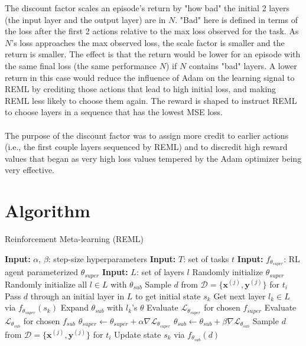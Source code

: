 The discount factor scales an episode's return by "how bad" the 
initial 2 layers (the input layer and the output layer) are in $N$. "Bad" here is 
defined in terms of the loss after the first 2 actions relative to the max 
loss observed for the task. 
As $N$'s loss approaches the max observed loss, the scale factor is smaller and 
the return is smaller.
The effect is that the return would be lower for an episode with the same final 
loss (the same performance $N$) if $N$ contains "bad" layers. A lower return in this 
case would reduce the influence of Adam on the learning signal to REML by 
crediting those actions that lead to high initial loss, and making REML less likely 
to choose them again. The reward is shaped to instruct REML to choose layers 
in a sequence that has the lowest MSE loss.
\\\\
The purpose of the discount 
factor was to assign more credit to earlier actions (i.e., the first couple layers 
sequenced by REML) and to discredit high reward values that began as very high loss
values tempered by the Adam optimizer being very effective.

\section{Algorithm}
\begin{algorithm}
\caption{Reinforcement Meta-learning (REML)}\label{alg:cap}
\begin{algorithmic}
\State \textbf{Input:} $\alpha$, $\beta$: step-size hyperparameters
\State \textbf{Input:} $T$: set of tasks $t$ 
\State \textbf{Input:} $f_{\theta_{super}}$: RL agent parameterized $\theta_{super}$
\State \textbf{Input:} $L$: set of layers $l$
\State Randomly initialize $\theta_{super}$
\State Randomly initialize all $l \in L$ with $\theta_{sub}$
\State Sample $d$ from $\mathcal{D} = \{\mathbf{x}^{(j)}, \mathbf{y}^{(j)}\}$ for $t_i$
\State Pass $d$ through an initial layer in $L$ to get initial state $s_k$ 
\State Get next layer $l_k \in L$ via $f_{\theta_{super}}(s_k)$
\State Expand $\theta_{sub}$ with $l_k$'s $\theta$
\State Evaluate $\mathcal{L}_{\theta_{super}}$ for chosen $f_{super}$ 
\State Evaluate $\mathcal{L}_{\theta_{sub}}$ for chosen $f_{sub}$ 
\State $\theta_{super} \leftarrow \theta_{super} + \alpha \nabla \mathcal{L}_{\theta_{super}}$ 
\State $\theta_{sub} \leftarrow \theta_{sub} + \beta \nabla \mathcal{L}_{\theta_{sub}}$ 
\State Sample $d$ from $\mathcal{D} = \{\mathbf{x}^{(j)}, \mathbf{y}^{(j)}\}$ for $t_i$
\State Update state $s_k$ via $f_{\theta_{sub}} (d)$
\EndWhile
\EndFor
\end{algorithmic}
\end{algorithm}

